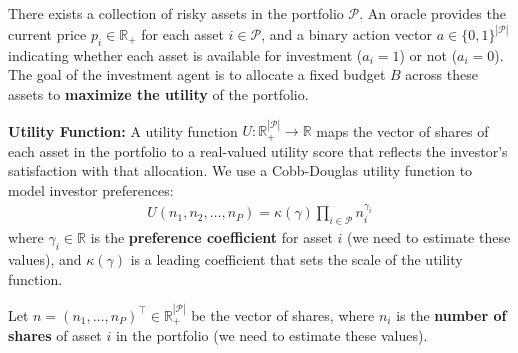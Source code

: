 \documentclass[aspectratio=169]{beamer}
\begin{document}
\begin{frame}
There exists a collection of risky assets in the portfolio $\mathcal{P}$.
An oracle provides the current price $p_{i}\in\mathbb{R}_{+}$ for each asset $i\in\mathcal{P}$, and 
a binary action vector $a\in\{0,1\}^{|\mathcal{P}|}$ indicating whether each asset is available for investment ($a_{i}=1$) or not ($a_{i}=0$).
The goal of the investment agent is to allocate a fixed budget $B$ across these assets to \textbf{maximize the utility} of the portfolio. 
\end{frame}

\begin{frame}
\textbf{Utility Function:} A utility function $U:\mathbb{R}_{+}^{|\mathcal{P}|}\to\mathbb{R}$ maps the vector of shares of each asset 
in the portfolio to a real-valued utility score that reflects the investor's satisfaction with that allocation. We use a Cobb-Douglas utility function to model investor preferences:
\begin{align*}
U\left(n_{1},n_{2},\dots,n_{P}\right) = \kappa(\gamma)\prod_{i\in\mathcal{P}}n_{i}^{\gamma_{i}}
\end{align*}
where $\gamma_{i}\in\mathbb{R}$ is the \textbf{preference coefficient} for asset $i$ (we need to estimate these values), and $\kappa(\gamma)$ is a leading coefficient that sets the scale of the utility function.

Let $n = (n_1, \dots, n_P)^\top \in \mathbb{R}_+^{|\mathcal{P}|}$ be the vector of shares, where $n_i$ is the \textbf{number of shares} of asset $i$ in the portfolio 
(we need to estimate these values). 
\end{frame}
\end{document}
